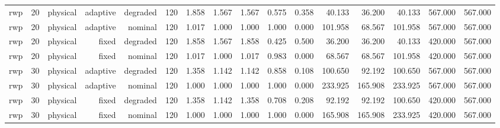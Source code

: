 \begin{tabular}{lrrrrrrrrrrrrrrr}
rwp & 20 & physical & adaptive & degraded & 120 & 1.858 & 1.567 & 1.567 & 0.575 & 0.358 & 40.133 & 36.200 & 40.133 & 567.000 & 567.000 \\
rwp & 20 & physical & adaptive & nominal & 120 & 1.017 & 1.000 & 1.000 & 1.000 & 0.000 & 101.958 & 68.567 & 101.958 & 567.000 & 567.000 \\
rwp & 20 & physical & fixed & degraded & 120 & 1.858 & 1.567 & 1.858 & 0.425 & 0.500 & 36.200 & 36.200 & 40.133 & 420.000 & 567.000 \\
rwp & 20 & physical & fixed & nominal & 120 & 1.017 & 1.000 & 1.017 & 0.983 & 0.000 & 68.567 & 68.567 & 101.958 & 420.000 & 567.000 \\
rwp & 30 & physical & adaptive & degraded & 120 & 1.358 & 1.142 & 1.142 & 0.858 & 0.108 & 100.650 & 92.192 & 100.650 & 567.000 & 567.000 \\
rwp & 30 & physical & adaptive & nominal & 120 & 1.000 & 1.000 & 1.000 & 1.000 & 0.000 & 233.925 & 165.908 & 233.925 & 567.000 & 567.000 \\
rwp & 30 & physical & fixed & degraded & 120 & 1.358 & 1.142 & 1.358 & 0.708 & 0.208 & 92.192 & 92.192 & 100.650 & 420.000 & 567.000 \\
rwp & 30 & physical & fixed & nominal & 120 & 1.000 & 1.000 & 1.000 & 1.000 & 0.000 & 165.908 & 165.908 & 233.925 & 420.000 & 567.000 \\
\bottomrule
\end{tabular}